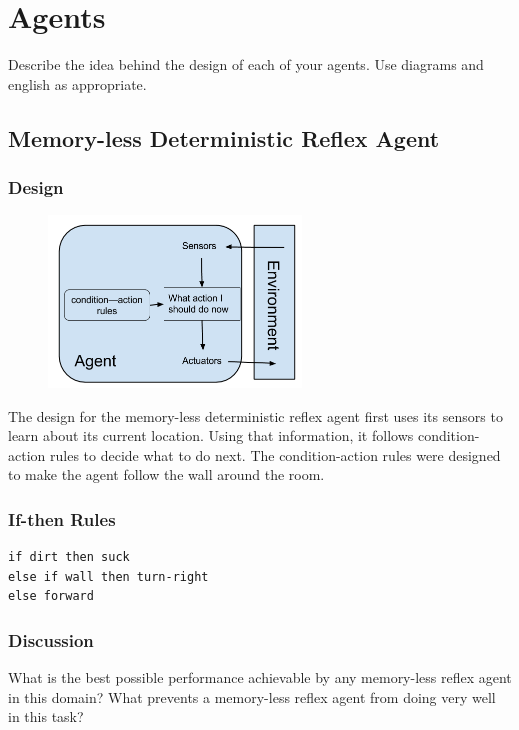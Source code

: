 \documentclass[a4paper,10pt]{article}
\begin{document}
\section{Agents}
Describe the idea behind the design of each of your agents. Use diagrams and english as appropriate.
\subsection{Memory-less Deterministic Reflex Agent}
\subsubsection{Design}
\begin{figure}[H]
	\begin{center}
		\includegraphics[width=0.6\textwidth]{MemorylessReflex.png}
	\end{center}
\end{figure}

The design for the memory-less deterministic reflex agent first uses its sensors to learn about its current location. Using that information, it follows condition-action rules to decide what to do next. The condition-action rules were designed to make the agent follow the wall around the room.

\subsubsection{If-then Rules}
\begin{verbatim}
if dirt then suck
else if wall then turn-right
else forward
\end{verbatim}

\subsubsection{Discussion}
What is the best possible performance achievable by any memory-less reflex agent in this domain? What prevents a memory-less reflex agent from doing very well in this task?
\end{document}
